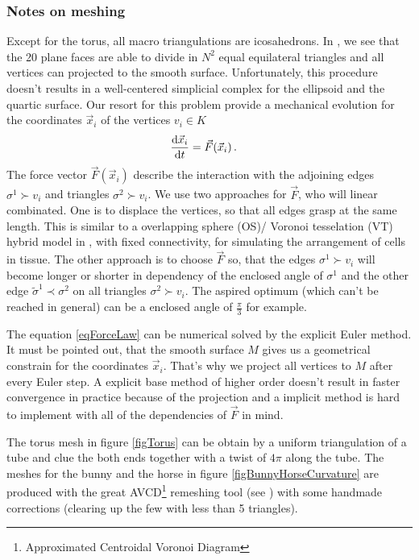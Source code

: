   \subsubsection{Notes on meshing}
    Except for the torus, all macro triangulations are icosahedrons.
    In \cite{arakawa}, we see that the 20 plane faces are able to divide in \( N^{2} \) equal equilateral triangles
    and all vertices can projected to the smooth surface.
    Unfortunately, this procedure doesn't results in a well-centered simplicial complex for the ellipsoid and the quartic surface.
    Our resort for this problem provide a mechanical evolution for the coordinates \( \vec{x}_{i} \) of the vertices \( v_{i}\in K \)
    \begin{align}\label{eqForceLaw}
      \frac{\mathrm{d} \vec{x}_{i}}{\mathrm{d} t} &= \vec{F}(\vec{x}_{i}) \,\text{.}
    \end{align}
    The force vector \( \vec{F}(\vec{x}_{i}) \) describe the interaction with the adjoining edges \( \sigma^{1}\succ v_{i} \) and
    triangles \( \sigma^{2}\succ v_{i} \).
    We use two approaches for \( \vec{F} \), who will linear combinated.
    One is to displace the vertices, so that all edges grasp at the same length.
    This is similar to a overlapping sphere (OS)/ Voronoi tesselation (VT) hybrid model in \cite{meshCooper}, with fixed connectivity, 
    for simulating the arrangement of cells in tissue.
    The other approach is to choose \( \vec{F} \) so, that the edges \( \sigma^{1}\succ v_{i} \) will become longer or shorter in dependency
    of the enclosed angle of \( \sigma^{1} \) and the other edge \( \tilde{\sigma}^{1}\prec\sigma^{2} \) 
    on all triangles \( \sigma^{2}\succ v_{i} \).
    The aspired optimum (which can't be reached in general) can be a enclosed angle of \( \frac{\pi}{3} \) for example.
    
    The equation \eqref{eqForceLaw} can be numerical solved by the explicit Euler method.
    It must be pointed out, that the smooth surface \( M \) gives us a geometrical constrain for the coordinates \( \vec{x}_{i} \).
    That's why we project all vertices to \( M \) after every Euler step.
    A explicit base method of higher order doesn't result in faster convergence in practice 
    because of the projection
    and a implicit method is hard to implement with all of the dependencies of \( \vec{F} \) in mind.

    The torus mesh in figure \ref{figTorus} can be obtain by a uniform triangulation of a tube and clue the both ends together 
    with a twist of \( 4\pi \) along the tube.
    The meshes for the bunny and the horse in figure \ref{figBunnyHorseCurvature} are produced with the  
    great AVCD\footnote{Approximated Centroidal Voronoi Diagram} remeshing tool (see \cite{valette}) with some handmade corrections 
    (clearing up the few  with less than 5 triangles).

